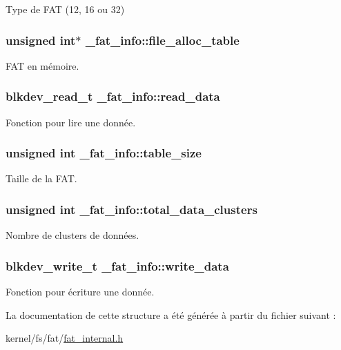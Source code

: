 \-Type de \-F\-A\-T (12, 16 ou 32) \hypertarget{struct__fat__info_a27195d09eb1dcd65d35d7b312d1bec0b}{
\subsubsection[{file\-\_\-alloc\-\_\-table}]{\setlength{\rightskip}{0pt plus 5cm}unsigned int$\ast$ {\bf \-\_\-fat\-\_\-info\-::file\-\_\-alloc\-\_\-table}}}\label{struct__fat__info_a27195d09eb1dcd65d35d7b312d1bec0b}
\-F\-A\-T en mémoire. \hypertarget{struct__fat__info_a443e425e86f7401bed57670103d74cf2}{
\subsubsection[{read\-\_\-data}]{\setlength{\rightskip}{0pt plus 5cm}blkdev\-\_\-read\-\_\-t {\bf \-\_\-fat\-\_\-info\-::read\-\_\-data}}}\label{struct__fat__info_a443e425e86f7401bed57670103d74cf2}
\-Fonction pour lire une donnée. \hypertarget{struct__fat__info_af110757af771c0f3fe0c515cca1ff177}{
\subsubsection[{table\-\_\-size}]{\setlength{\rightskip}{0pt plus 5cm}unsigned int {\bf \-\_\-fat\-\_\-info\-::table\-\_\-size}}}\label{struct__fat__info_af110757af771c0f3fe0c515cca1ff177}
\-Taille de la \-F\-A\-T. \hypertarget{struct__fat__info_ab43681d4b5c7cf719cd6c934cada39e3}{
\subsubsection[{total\-\_\-data\-\_\-clusters}]{\setlength{\rightskip}{0pt plus 5cm}unsigned int {\bf \-\_\-fat\-\_\-info\-::total\-\_\-data\-\_\-clusters}}}\label{struct__fat__info_ab43681d4b5c7cf719cd6c934cada39e3}
\-Nombre de clusters de données. \hypertarget{struct__fat__info_a419699acceacb59718e0b1f9262de102}{
\subsubsection[{write\-\_\-data}]{\setlength{\rightskip}{0pt plus 5cm}blkdev\-\_\-write\-\_\-t {\bf \-\_\-fat\-\_\-info\-::write\-\_\-data}}}\label{struct__fat__info_a419699acceacb59718e0b1f9262de102}
\-Fonction pour écriture une donnée. 

\-La documentation de cette structure a été générée à partir du fichier suivant \-:\begin{DoxyCompactItemize}
\item 
kernel/fs/fat/\hyperlink{fat__internal_8h}{fat\-\_\-internal.\-h}\end{DoxyCompactItemize}

